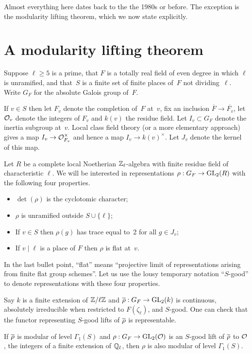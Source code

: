 Almost everything here dates back to the the 1980s or before.
The exception is the modularity lifting theorem, which we now state explicitly.

\section{A modularity lifting theorem}

Suppose $\ell\geq5$ is a prime, that $F$ is a totally real field of even degree in which $\ell$
is unramified, and that~$S$ is a finite set of finite places of~$F$ not dividing~$\ell$. Write
$G_F$ for the absolute Galois group of~$F$.

If $v\in S$ then let $F_v$ denote the completion of~$F$ at~$v$, fix an inclusion $\overline{F}\to\overline{F_v}$,
let $\mathcal{O}_v$ denote the integers of $F_v$ and $k(v)$ the residue field. Let $I_v\subset G_F$ denote the inertia
subgroup at~$v$. Local class field theory (or a more elementary approach) gives a map $I_v\to\mathcal{O}_{F_v}^\times$
and hence a map $I_v\to k(v)^\times$. Let $J_v$ denote the kernel of this map.

Let $R$ be a complete local Noetherian $\mathbb{Z}_\ell$-algebra with finite residue field of characteristic $\ell$.
We will be interested in representations $\rho:G_F\to\operatorname{GL}_2(R)$ with the following four properties.
\begin{itemize}
    \item $\det(\rho)$ is the cyclotomic character;
    \item $\rho$ is unramified outside $S\cup\{\ell\}$;
    \item If $v\in S$ then $\rho(g)$ has trace equal to~2 for all $g\in J_v$;
    \item If $v\mid\ell$ is a place of $F$ then $\rho$ is flat at~$v$.
\end{itemize}

In the last bullet point, ``flat'' means ``projective limit of representations arising from
finite flat group schemes''. Let us use the lousy temporary notation ``$S$-good'' to denote
representations with these four properties.

Say $k$ is a finite extension of $\mathbb{Z}/\ell\mathbb{Z}$ and $\overline{\rho}:G_F\to\operatorname{GL}_2(k)$ is continuous,
absolutely irreducible when restricted to $F(\zeta_\ell)$, and $S$-good. One can check
that the functor representing $S$-good lifts of $\overline{\rho}$ is representable.

\begin{theorem}
    \label{modularity_lifting_theorem}
      \notready
        If $\overline{\rho}$ is modular of level $\Gamma_1(S)$ and $\rho:G_F\to\operatorname{GL}_2(\mathcal{O})$ is
        an $S$-good lift of $\overline{\rho}$ to $\mathcal{O}$, the integers of a finite extension of $\mathbb{Q}_\ell$,
        then $\rho$ is also modular of level $\Gamma_1(S)$.
\end{theorem}

